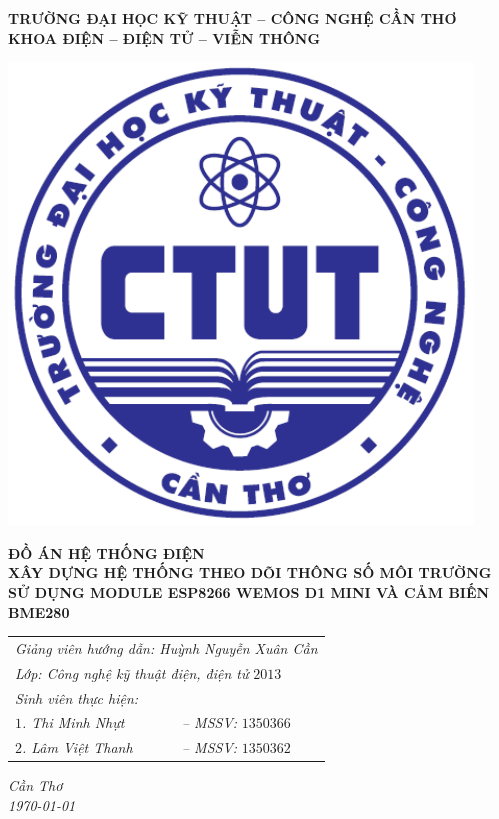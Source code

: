 \begin{titlepage}
	\centering
	\newcommand{\HRule}{\rule{.375\linewidth}{0.5mm}}
	\begin{normalsize}
\textbf{TRƯỜNG ĐẠI HỌC KỸ THUẬT -- CÔNG NGHỆ CẦN THƠ\\KHOA ĐIỆN -- ĐIỆN TỬ -- VIỄN THÔNG\\\vspace{1.5cm}}
 \end{normalsize}
	\includegraphics[width=.2\textwidth]{logo_ctut.pdf}\par\vspace{1.5cm}
	{\LARGE \textbf{ĐỒ ÁN HỆ THỐNG ĐIỆN} \vspace{.5cm} \\  \textbf{XÂY DỰNG HỆ THỐNG THEO DÕI THÔNG SỐ MÔI TRƯỜNG SỬ DỤNG MODULE ESP8266 WEMOS D1 MINI VÀ CẢM BIẾN BME280}\par}
	\vspace{2cm}
	
	\begin{tabular}{ll}
	\multicolumn{2}{l}{{\Large \textit{Giảng viên hướng dẫn: \quad Huỳnh Nguyễn Xuân Cần}}}\vspace{.3cm}\\
\multicolumn{2}{l}{{\Large \textit{Lớp: \quad Công nghệ kỹ thuật điện, điện tử} $2013$}}\vspace{.3cm}\\
	{\Large \textit{Sinh viên thực hiện:}} &\vspace{.2cm}\\	
	{\Large \hspace{1.5cm}\textit{$1$. Thi Minh Nhựt}}& {\Large \textit{-- MSSV:} $1350366$}\vspace{.2cm}\\
	{\Large \hspace{1.5cm}\textit{$2$. Lâm Việt Thanh}}& {\Large \textit{-- MSSV:} $1350362$}\vspace{.2cm}\\
	\end{tabular}
	
	\vfill
	
	
	\vfill
	
	{\large \textit{Cần Thơ\\\today}\par}
\end{titlepage}

